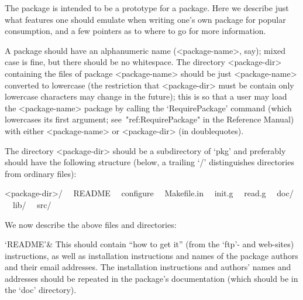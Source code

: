 

The {\Example} package is intended to be a prototype for a package.  Here
we describe just what features one should emulate when writing one's  own
{\GAP} package for popular consumption, and a few pointers as to where to
go for more information.


A {\GAP} package should have an alphanumeric name (<package-name>,  say);
mixed case is fine, but there should  be  no  whitespace.  The  directory
<package-dir> containing the files of package  <package-name>  should  be
just  <package-name>  converted  to  lowercase  (the   restriction   that
<package-dir> must be contain only lowercase characters may change in the
future); this is so that a user may load the  <package-name>  package  by
calling  the  `RequirePackage'  command  (which  lowercases   its   first
argument; see~"ref:RequirePackage" in the Reference Manual)  with  either
<package-name> or <package-dir> (in doublequotes).

The directory  <package-dir>  should  be  a  subdirectory  of  `pkg'  and
preferably should have the following structure  (below,  a  trailing  `/'
distinguishes directories from ordinary files):

<package-dir>/
\ \ README
\ \ configure
\ \ Makefile.in
\ \ init.g
\ \ read.g
\ \ doc/
\ \ lib/
\ \ src/

We now describe the above files and directories:

\beginitems

`README'&
This should contain ``how  to  get  it''  (from  the  {\GAP}  `ftp'-  and
web-sites) instructions, as well as installation instructions  and  names
of the package  authors  and  their  email  addresses.  The  installation
instructions and authors' names and addresses should be repeated  in  the
package's documentation (which should be in the `doc' directory).

